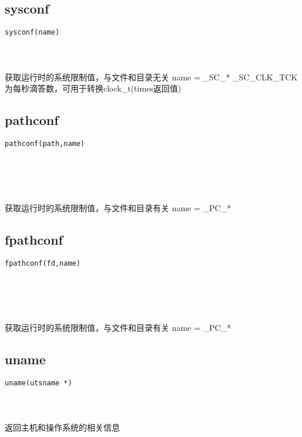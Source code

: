 \documentclass[10pt,a4paper]{article}
\begin{document}
\subsection{sysconf}
\begin{spacing}{2.0}
\lstset{language=C,numbers=none}
\begin{lstlisting}
sysconf(name)
\end{lstlisting}
{\large\color[rgb]{0.2,0.4,0.6}{name:}}
\paragraph{ \ \ }获取运行时的系统限制值，与文件和目录无关 name = \_SC\_* \_SC\_CLK\_TCK为每秒滴答数，可用于转换clock\_t(times返回值)
\end{spacing}

\subsection{pathconf}
\begin{spacing}{2.0}
\lstset{language=C,numbers=none}
\begin{lstlisting}
pathconf(path,name)
\end{lstlisting}
{\large\color[rgb]{0.2,0.4,0.6}{path:}} \\
{\large\color[rgb]{0.2,0.4,0.6}{name:}}
\paragraph{ \ \ }获取运行时的系统限制值，与文件和目录有关 name = \_PC\_*
\end{spacing}

\subsection{fpathconf}
\begin{spacing}{2.0}
\lstset{language=C,numbers=none}
\begin{lstlisting}
fpathconf(fd,name)
\end{lstlisting}
{\large\color[rgb]{0.2,0.4,0.6}{fd:}} \\
{\large\color[rgb]{0.2,0.4,0.6}{name:}}
\paragraph{ \ \ }获取运行时的系统限制值，与文件和目录有关 name = \_PC\_*
\end{spacing}

\subsection{uname}
\begin{spacing}{2.0}
\lstset{language=C,numbers=none}
\begin{lstlisting}
uname(utsname *)
\end{lstlisting}
{\large\color[rgb]{0.2,0.4,0.6}{*:}}
\paragraph{ \ \ }返回主机和操作系统的相关信息
\end{spacing}
\end{document}
